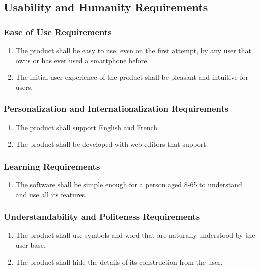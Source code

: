 \documentclass[]{article}
\begin{document}
\subsection{Usability and Humanity Requirements}
\label{sub:usability_and_humanity_requirements}

\subsubsection{Ease of Use Requirements}
\label{ssub:ease_of_use_requirements}
\begin{enumerate}[{UH}1. ]
	\item The product shall be easy to use, even on the first attempt, by any user that owns or has ever used a smartphone before.
	\item The initial user experience of the product shall be pleasant and intuitive for users.
\end{enumerate}

\subsubsection{Personalization and Internationalization Requirements}
\label{ssub:personalization_and_internationalization_requirements}
\begin{enumerate}[{UH}1. ]
	\item The product shall support English and French
	\item The product shall be developed with web editors that support
\end{enumerate}

\subsubsection{Learning Requirements}
\label{ssub:learning_requirements}
\begin{enumerate}[{UH}1. ]
	\item The software shall be simple enough for a person aged 8-65 to understand and use all its features.
\end{enumerate}

\subsubsection{Understandability and Politeness Requirements}
\label{ssub:understandability_and_politeness_requirements}
\begin{enumerate}[{UH}1. ]
	\item  The product shall use symbols and word that are naturally understood by the user-base.
	\item  The product shall hide the details of its construction from the user.
\end{enumerate}
\end{document}
